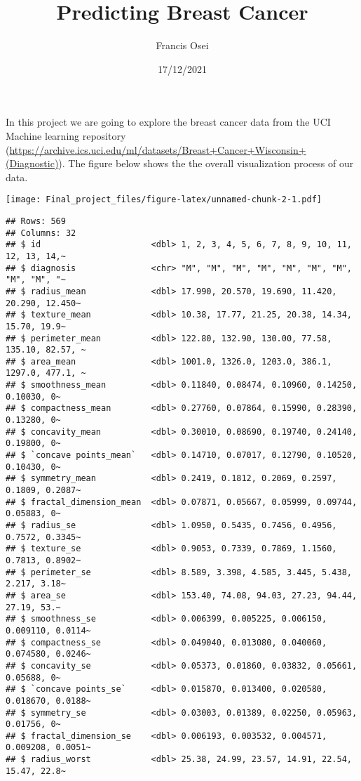 \documentclass[
]{article}
\title{Predicting Breast Cancer}
\author{Francis Osei}
\date{17/12/2021}
\begin{document}
\maketitle

In this project we are going to explore the breast cancer data from the
UCI Machine learning repository
(\url{https://archive.ics.uci.edu/ml/datasets/Breast+Cancer+Wisconsin+(Diagnostic)}).
The figure below shows the the overall visualization process of our
data.

\texttt{[image: Final\_project\_files/figure-latex/unnamed-chunk-2-1.pdf]}

\begin{verbatim}
## Rows: 569
## Columns: 32
## $ id                      <dbl> 1, 2, 3, 4, 5, 6, 7, 8, 9, 10, 11, 12, 13, 14,~
## $ diagnosis               <chr> "M", "M", "M", "M", "M", "M", "M", "M", "M", "~
## $ radius_mean             <dbl> 17.990, 20.570, 19.690, 11.420, 20.290, 12.450~
## $ texture_mean            <dbl> 10.38, 17.77, 21.25, 20.38, 14.34, 15.70, 19.9~
## $ perimeter_mean          <dbl> 122.80, 132.90, 130.00, 77.58, 135.10, 82.57, ~
## $ area_mean               <dbl> 1001.0, 1326.0, 1203.0, 386.1, 1297.0, 477.1, ~
## $ smoothness_mean         <dbl> 0.11840, 0.08474, 0.10960, 0.14250, 0.10030, 0~
## $ compactness_mean        <dbl> 0.27760, 0.07864, 0.15990, 0.28390, 0.13280, 0~
## $ concavity_mean          <dbl> 0.30010, 0.08690, 0.19740, 0.24140, 0.19800, 0~
## $ `concave points_mean`   <dbl> 0.14710, 0.07017, 0.12790, 0.10520, 0.10430, 0~
## $ symmetry_mean           <dbl> 0.2419, 0.1812, 0.2069, 0.2597, 0.1809, 0.2087~
## $ fractal_dimension_mean  <dbl> 0.07871, 0.05667, 0.05999, 0.09744, 0.05883, 0~
## $ radius_se               <dbl> 1.0950, 0.5435, 0.7456, 0.4956, 0.7572, 0.3345~
## $ texture_se              <dbl> 0.9053, 0.7339, 0.7869, 1.1560, 0.7813, 0.8902~
## $ perimeter_se            <dbl> 8.589, 3.398, 4.585, 3.445, 5.438, 2.217, 3.18~
## $ area_se                 <dbl> 153.40, 74.08, 94.03, 27.23, 94.44, 27.19, 53.~
## $ smoothness_se           <dbl> 0.006399, 0.005225, 0.006150, 0.009110, 0.0114~
## $ compactness_se          <dbl> 0.049040, 0.013080, 0.040060, 0.074580, 0.0246~
## $ concavity_se            <dbl> 0.05373, 0.01860, 0.03832, 0.05661, 0.05688, 0~
## $ `concave points_se`     <dbl> 0.015870, 0.013400, 0.020580, 0.018670, 0.0188~
## $ symmetry_se             <dbl> 0.03003, 0.01389, 0.02250, 0.05963, 0.01756, 0~
## $ fractal_dimension_se    <dbl> 0.006193, 0.003532, 0.004571, 0.009208, 0.0051~
## $ radius_worst            <dbl> 25.38, 24.99, 23.57, 14.91, 22.54, 15.47, 22.8~

\end{verbatim}
\end{document}
